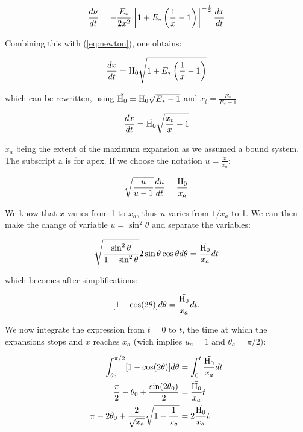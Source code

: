 \begin{equation}
\frac{d \nu}{dt} = - \frac{E_\ast}{2 x^2} \left[ 1 + E_\ast\left(\frac{1}{x} -1\right)\right]^{-\frac{1}{2}} \frac{dx}{dt}
\end{equation}

Combining this with (\ref{eq:newton}), one obtains:

\begin{equation}
\frac{dx}{dt} = {\textrm{H}}_0 \sqrt{1+ E_\ast\left( \frac{1}{x} -1\right)}
\end{equation}

which can be rewritten, using $\tilde{{\textrm{H}}_0} = {\textrm{H}}_0 \sqrt{E_\ast-1}$ and $x_t=\frac{E_\ast}{E_\ast-1}$

\begin{equation}
\frac{dx}{dt} = \tilde{{\textrm{H}}_0} \sqrt{\frac{x_t}{x}-1}
\end{equation}

$x_a$ being the extent of the maximum expansion as we assumed a bound system. The subscript a is for apex. If we choose the notation $u = \frac{x}{x_a}$:

\begin{equation}
\sqrt{\frac{u}{u-1}} \frac{du}{dt} = \frac{\tilde{{\textrm{H}}_0}}{x_a}
\end{equation}

We know that $x$ varies from 1 to $x_a$, thus $u$ varies from $1/x_a$ to 1. We can then make the change of variable $u = \sin^2\theta$ and separate the variables:

\begin{equation}
\sqrt{\frac{\sin^2\theta}{1-\sin^2\theta}} 2 \sin\theta \cos\theta d \theta = \frac{\tilde{{\textrm{H}}_0}}{x_a} dt
\end{equation}

which becomes after simplifications:

\begin{equation}
\label{Eq:1_integrand_theta}
[ 1 - \cos(2\theta)]d\theta = \frac{\tilde{{\textrm{H}}_0}}{x_a} dt .
\end{equation}


We now integrate the expression from $t=0$ to $t$, the time at which the expansions stops and $x$ reaches $x_a$ (wich implies $u_a = 1$ and $\theta_a = \pi /2)$:

\begin{align}
\int^{\pi/2}_{\theta_0} [ 1 - \cos(2\theta)]d\theta  & = \int^t_0 \frac{\tilde{{\textrm{H}}_0}}{x_a} dt\\
\frac{\pi}{2} - \theta_0 + \frac{\sin(2\theta_0)}{2} & =  \frac{\tilde{{\textrm{H}}_0}}{x_a} t\\
\pi - 2 \theta_0 + \frac{2}{\sqrt{x_a}}\sqrt{1-\frac{1}{x_a}} & = 2 \frac{\tilde{{\textrm{H}}_0}}{x_a} t 
\end{align}

